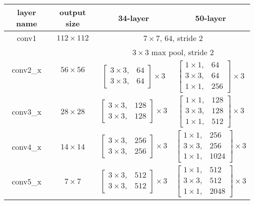 \begin{table}[]
\centering
\begin{tabular}{ | c | c | c | c | }
\hline
layer name			& output size 					& 34-layer																& 50-layer																			\\ \hline
conv1				& $112 \times112$				& \multicolumn{2}{c|}{$ 7 \times 7$, $64$, stride $2$}																												\\ \hline
\multirow{2}{*}{conv2\_x}	& \multirow{2}{*}{$56 \times 56$} 	& \multicolumn{2}{c|}{$3 \times 3$ max pool, stride $2$}																											\\ \cline{3-4} 
					&							& $\begin{bmatrix} 3 \times 3, &   64 \\ 3 \times 3, &   64 \end{bmatrix} \times 3 $		& $\begin{bmatrix}1 \times 1, & 64 \\ 3 \times 3, & 64 \\ 1 \times 1, & 256 \end{bmatrix}^{} \times 3 $ 		\\ \hline
conv3\_x				& $28 \times 28$				& $\begin{bmatrix} 3 \times 3, & 128 \\ 3 \times 3, & 128 \end{bmatrix} \times 3 $		& $\begin{bmatrix}1 \times 1, & 128 \\ 3 \times 3, & 128 \\ 1 \times 1, & 512 \end{bmatrix} \times 3$		\\ \hline
conv4\_x				& $14 \times 14$				& $\begin{bmatrix} 3 \times 3, & 256 \\ 3 \times 3, & 256 \end{bmatrix} \times 3 $		& $\begin{bmatrix}1 \times 1, & 256 \\ 3 \times 3, & 256 \\ 1 \times 1, & 1024 \end{bmatrix} \times 3$		\\ \hline
conv5\_x				& $  7 \times   7$				& $\begin{bmatrix} 3 \times 3, & 512 \\ 3 \times 3, & 512 \end{bmatrix} \times 3 $		& $\begin{bmatrix}1 \times 1, & 512 \\ 3 \times 3, & 512 \\ 1 \times 1, & 2048 \end{bmatrix} \times 3$		\\ \hline

\end{tabular}
\end{table}
